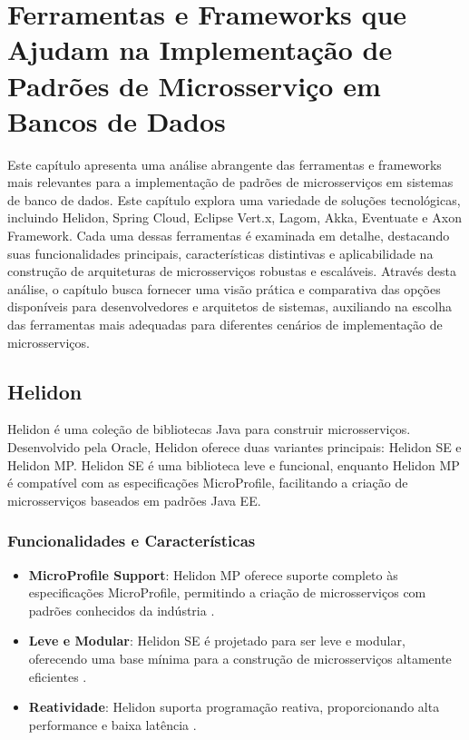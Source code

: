 \chapter{Ferramentas e Frameworks que Ajudam na Implementação de Padrões de Microsserviço em Bancos de Dados}

Este capítulo apresenta uma análise abrangente das ferramentas e frameworks mais relevantes para a implementação de padrões de microsserviços em sistemas de banco de dados. Este capítulo explora uma variedade de soluções tecnológicas, incluindo Helidon, Spring Cloud, Eclipse Vert.x, Lagom, Akka, Eventuate e Axon Framework. Cada uma dessas ferramentas é examinada em detalhe, destacando suas funcionalidades principais, características distintivas e aplicabilidade na construção de arquiteturas de microsserviços robustas e escaláveis. Através desta análise, o capítulo busca fornecer uma visão prática e comparativa das opções disponíveis para desenvolvedores e arquitetos de sistemas, auxiliando na escolha das ferramentas mais adequadas para diferentes cenários de implementação de microsserviços.

\section{Helidon}
Helidon é uma coleção de bibliotecas Java para construir microsserviços. Desenvolvido pela Oracle, Helidon oferece duas variantes principais: Helidon SE e Helidon MP. Helidon SE é uma biblioteca leve e funcional, enquanto Helidon MP é compatível com as especificações MicroProfile, facilitando a criação de microsserviços baseados em padrões Java EE.

\subsection{Funcionalidades e Características}
\begin{itemize}
    \item \textbf{MicroProfile Support}: Helidon MP oferece suporte completo às especificações MicroProfile, permitindo a criação de microsserviços com padrões conhecidos da indústria \cite{Helidon2021}.
    \item \textbf{Leve e Modular}: Helidon SE é projetado para ser leve e modular, oferecendo uma base mínima para a construção de microsserviços altamente eficientes \cite{Helidon2021}.
    \item \textbf{Reatividade}: Helidon suporta programação reativa, proporcionando alta performance e baixa latência \cite{Helidon2021}.
\end{itemize}

